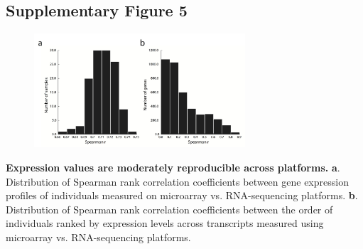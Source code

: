 \pagebreak
\subsection{Supplementary Figure 5}
\begin{figure}[h!]
\centering
\label{fig:estrsupfig5}
\includegraphics[width=0.7\textwidth]{Figures/Chapter4/SuppFig5.jpg}
\end{figure}

\textbf{Expression values are moderately reproducible across platforms.} \textbf{a}. Distribution of Spearman rank correlation coefficients between gene expression profiles of individuals measured on microarray vs. RNA-sequencing platforms. \textbf{b}. Distribution of Spearman rank correlation coefficients between the order of individuals ranked by expression levels across transcripts measured using microarray vs. RNA-sequencing platforms.

\pagebreak
